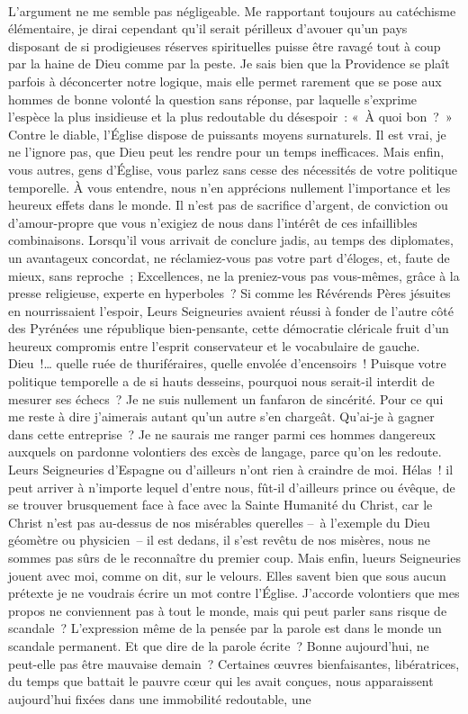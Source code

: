 \documentclass[french,twoside]{book} %
\newcommand{\astertri}{\medskip\par\centerline{\color{rubric}\large\selectfont{\syms ✻\,✻\,✻}}\medskip\par}%
\begin{document}
\astertri

\noindent  \par
L’argument ne me semble pas négligeable. Me rapportant toujours au catéchisme élémentaire, je dirai cependant qu’il serait périlleux d’avouer qu’un pays disposant de si prodigieuses réserves spirituelles puisse être ravagé tout à coup par la haine de Dieu comme par la peste. Je sais bien que la Providence se plaît parfois à déconcerter notre logique, mais elle permet rarement que se pose aux hommes de bonne volonté la question sans réponse, par laquelle s’exprime l’espèce la plus insidieuse et la plus redoutable du désespoir : « À quoi bon ? » Contre le diable, l’Église dispose de puissants moyens surnaturels. Il est vrai, je ne l’ignore pas, que Dieu peut les rendre pour un temps inefficaces. Mais enfin, vous autres, gens d’Église, vous parlez sans cesse des nécessités de votre politique temporelle. À vous entendre, nous n’en apprécions nullement l’importance et les heureux effets dans le monde. Il n’est pas de sacrifice d’argent, de conviction ou d’amour-propre que vous n’exigiez de nous dans l’intérêt de ces infaillibles combinaisons. Lorsqu’il vous arrivait de conclure jadis, au temps des diplomates, un avantageux concordat, ne réclamiez-vous pas votre part d’éloges, et, faute de mieux, sans reproche ; Excellences, ne la preniez-vous pas vous-mêmes, grâce à la presse religieuse, experte en hyperboles ? Si comme les Révérends Pères jésuites en nourrissaient l’espoir, Leurs Seigneuries avaient réussi à fonder de l’autre côté des Pyrénées une république bien-pensante, cette démocratie cléricale fruit d’un heureux compromis entre l’esprit conservateur et le vocabulaire de gauche. Dieu !… quelle ruée de thuriféraires, quelle envolée d’encensoirs ! Puisque votre politique temporelle a de si hauts desseins, pourquoi nous serait-il interdit de mesurer ses échecs ? Je ne suis nullement un fanfaron de sincérité. Pour ce qui me reste à dire j’aimerais autant qu’un autre s’en chargeât. Qu’ai-je à gagner dans cette entreprise ? Je ne saurais me ranger parmi ces hommes dangereux auxquels on pardonne volontiers des excès de langage, parce qu’on les redoute. Leurs Seigneuries d’Espagne ou d’ailleurs n’ont rien à craindre de moi. Hélas ! il peut arriver à n’importe lequel d’entre nous, fût-il d’ailleurs prince ou évêque, de se trouver brusquement face à face avec la Sainte Humanité du Christ, car le Christ n’est pas au-dessus de nos misérables querelles – à l’exemple du Dieu géomètre ou physicien – il est dedans, il s’est revêtu de nos misères, nous ne sommes pas sûrs de le reconnaître du premier coup. Mais enfin, lueurs Seigneuries jouent avec moi, comme on dit, sur le velours. Elles savent bien que sous aucun prétexte je ne voudrais écrire un mot contre l’Église. J’accorde volontiers que mes propos ne conviennent pas à tout le monde, mais qui peut parler sans risque de scandale ? L’expression même de la pensée par la parole est dans le monde un scandale permanent. Et que dire de la parole écrite ? Bonne aujourd’hui, ne peut-elle pas être mauvaise demain ? Certaines œuvres bienfaisantes, libératrices, du temps que battait le pauvre cœur qui les avait conçues, nous apparaissent aujourd’hui fixées dans une immobilité redoutable, une 
\end{document}
